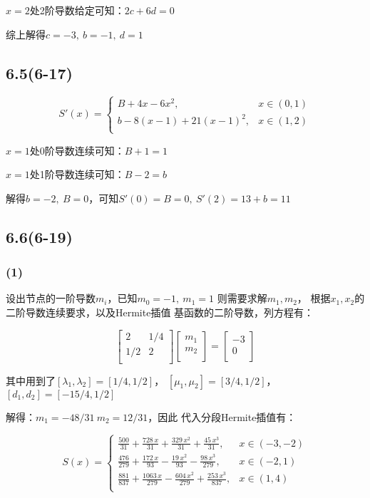 \documentclass[UTF8,zihao=5]{ctexart}
\begin{document}
$x=2$处2阶导数给定可知：$2c+6d=0$

综上解得$c=-3,~b=-1,~d=1$

\subsection*{6.5(6-17)}

$$
    S'(x)=\left\{
    \begin{array}{lr}
        B+4x-6x^2,          & x\in(0,1) \\
        b-8(x-1)+21(x-1)^2, & x\in(1,2) \\
    \end{array}
    \right.
$$

$x=1$处0阶导数连续可知：$B+1=1$

$x=1$处1阶导数连续可知：$B-2=b$

解得$b=-2,~B=0$，可知$S'(0)=B=0,~S'(2)=13+b=11$

\subsection*{6.6(6-19)}

\subsubsection*{(1)}
设出节点的一阶导数$m_i$，已知$m_0=-1,~m_1=1$
则需要求解$m_1,m_2$，
根据$x_1,x_2$的二阶导数连续要求，以及Hermite插值
基函数的二阶导数，列方程有：

$$
    \begin{bmatrix}
        2   & 1/4 \\
        1/2 & 2   \\
    \end{bmatrix}\begin{bmatrix}
        m_1 \\
        m_2 \\
    \end{bmatrix}
    =\begin{bmatrix}
        -3 \\
        0  \\
    \end{bmatrix}
$$

其中用到了$[\lambda_1,\lambda_2]=[1/4,1/2]$，
$[\mu_1,\mu_2]=[3/4,1/2]$，
$[d_1,d_2]=[-15/4,1/2]$

解得：$m_1=-48/31~m_2=12/31$，因此
代入分段Hermite插值有：

$$
    S(x)=\left\{
    \begin{array}{lr}
        \frac{500}{31}+\frac{728\,x}{31}+\frac{329\,x^2}{31}+\frac{45\,x^3}{31},       & x\in(-3,-2) \\
        \frac{476}{279}+\frac{172\,x}{93}-\frac{19\,x^2}{93}-\frac{98\,x^3}{279},      & x\in(-2,1)  \\
        \frac{881}{837}+\frac{1063\,x}{279}-\frac{604\,x^2}{279}+\frac{253\,x^3}{837}, & x\in(1,4)   \\
    \end{array}
    \right.
$$
\end{document}
